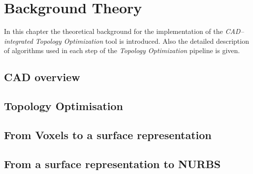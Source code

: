 \chapter{Background Theory}
In this chapter the theoretical background for the implementation of the \textit{CAD--integrated Topology Optimization} tool is introduced.  Also the detailed description of algorithms used in each step of the \textit{Topology Optimization} pipeline is given.
\label{chapter:Background}

\section{CAD overview}


\section{Topology Optimisation}


%

\section{From Voxels to a surface representation}


\section{From a surface representation to NURBS}
\label{sec:NURBS}



